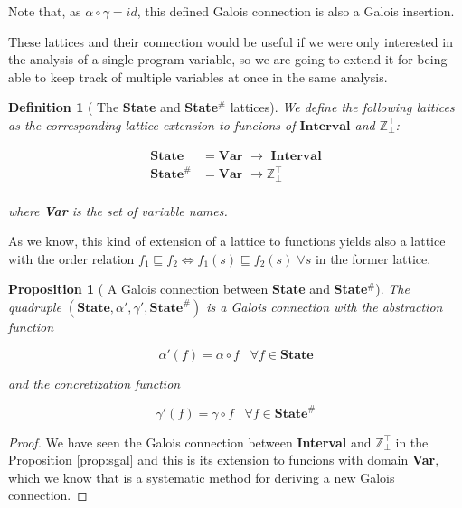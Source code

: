 \documentclass{article}
\newtheorem{definition}{Definition}
\newtheorem{proposition}{Proposition}
\begin{document}
Note that, as $\alpha \circ \gamma = id$, this defined Galois 
connection is also a Galois insertion. 

These lattices and their connection would be useful if we were only 
interested in the analysis of a single program variable, so we are
going to extend it for being able to keep track of multiple 
variables at once in the same analysis.

\begin{definition}[
  The \textbf{State} and \textbf{State$^{\#}$} lattices
]\label{def:slattice}
  We define the following lattices as the corresponding lattice 
  extension to funcions of $\textbf{Interval}$ and 
    $\mathbb{Z}_\bot^\top$:

    \begin{align*}
      \textbf{State } &= 
        \textbf{Var } \rightarrow \textbf{ Interval} \\
      \textbf{State}^\# &= 
        \textbf{Var } \rightarrow \mathbb{Z}_\bot^\top \\
    \end{align*}

    where \textbf{Var} is the set of variable names.
\end{definition}

As we know, this kind of extension of a lattice to functions 
yields also a lattice with the order relation 
$f_1 \sqsubseteq f_2 \iff f_1(s) \sqsubseteq f_2(s) \; \forall s$ 
in the former lattice.

\begin{proposition}[
  A Galois connection between \textbf{State} 
  and \textbf{State$^{\#}$}
]\label{prop:mgal}
  The quadruple 
  $(\textbf{State}, \alpha', \gamma', \textbf{State}^\#)$ is a 
  Galois connection with the abstraction function

  $$
    \alpha'(f) = \alpha \circ f \;\;\; \forall f \in \textbf{State}
  $$

  and the concretization function

  $$
    \gamma'(f) = \gamma \circ f \;\;\; \forall f \in 
      \textbf{State}^\#
  $$

\end{proposition}

\begin{proof}
  We have seen the Galois connection between \textbf{Interval}
  and $\mathbb{Z}_\bot^\top$ in the Proposition \ref{prop:sgal} 
  and this is its extension to funcions with domain \textbf{Var}, 
  which we know that is a systematic method for deriving a new 
  Galois connection.
\end{proof}
\end{document}

